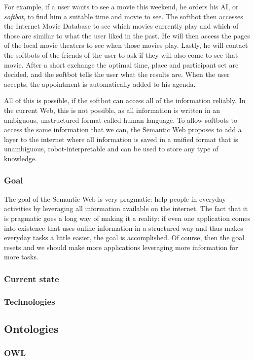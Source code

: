 \documentclass{article}
\begin{document}
For example, if a user wants to see a movie this weekend, he orders his AI, or \textit{softbot}, to find him a suitable time and movie to see. The softbot then accesses the Internet Movie Database to see which movies currently play and which of those are similar to what the user liked in the past. He will then access the pages of the local movie theaters to see when those movies play. Lastly, he will contact the softbots of the friends of the user to ask if they will also come to see that movie. After a short exchange the optimal time, place and participant set are decided, and the softbot tells the user what the results are. When the user accepts, the appointment is automatically added to his agenda.

All of this is possible, if the softbot can access all of the information reliably. In the current Web, this is not possible, as all information is written in an ambiguous, unstructured format called human language. To allow softbots to access the same information that we can, the Semantic Web proposes to add a layer to the internet where all information is saved in a unified format that is unambiguous, robot-interpretable and can be used to store any type of knowledge.
 
 \subsubsection{Goal}
 The goal of the Semantic Web is very pragmatic: help people in everyday activities by leveraging all information available on the internet. The fact that it is pragmatic goes a long way of making it a reality: if even one application comes into existence that uses online information in a structured way and thus makes everyday tasks a little easier, the goal is accomplished. Of course, then the goal resets and we should make more applications leveraging more information for more tasks.
 \subsubsection{Current state}
 
 \subsubsection{Technologies}
 \subsection{Ontologies}
 \subsubsection{OWL}
\end{document}
